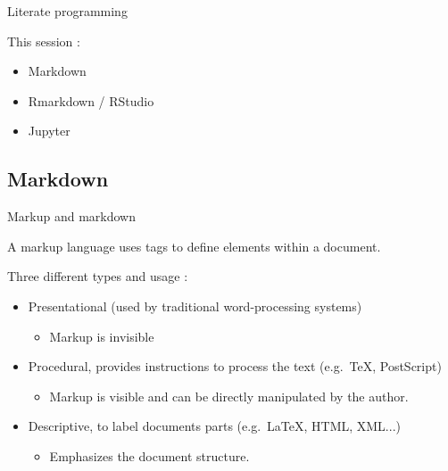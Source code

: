 %

\begin{frame}{Literate programming}

This session :
\begin{itemize}
  \item Markdown
  \item Rmarkdown / RStudio
  \item Jupyter
\end{itemize}

\end{frame}

\subsection{Markdown}

\begin{frame}{Markup and markdown}

\begin{definition}
A markup language uses tags to define elements within a document.
\end{definition}
\vfill
Three different types and usage :
\begin{itemize}
  \item Presentational (used by traditional word-processing systems)
  \begin{itemize}
      \item Markup is invisible
  \end{itemize}
  \item Procedural, provides instructions to process the text (e.g.\ TeX, PostScript)
  \begin{itemize}
      \item Markup is visible and can be directly manipulated by the author.
  \end{itemize}
  \item Descriptive, to label documents parts (e.g.\ LaTeX, HTML, XML...)
  \begin{itemize}
      \item Emphasizes the document structure.
  \end{itemize}
\end{itemize}

\end{frame}

